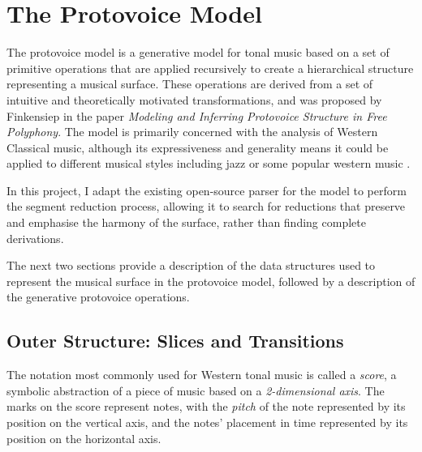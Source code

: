 \documentclass[12pt,a4paper,twoside,openany]{report} \usepackage[pdfborder={0 0 0}]{hyperref}    %
\theoremstyle{definition} \newtheorem{definition}{Definition}[section]
\begin{document}


\section{The Protovoice Model}
\label{sec:protovoiceModel}

The protovoice model is a generative model for tonal music based on a set of primitive operations that are applied
recursively to create a hierarchical structure representing a musical surface. 
These operations are derived from a set of intuitive and theoretically motivated transformations, and was proposed by Finkensiep in the paper 
\textit{Modeling and Inferring Protovoice Structure in Free Polyphony}\cite{finkensiepModelingInferringProtovoice2021}.
The model is primarily concerned with the analysis of Western Classical music, although its expressiveness and generality means it could be applied to different musical styles including jazz or some popular western music \cite{finkensiepStructureFreePolyphony2023}. 

In this project, I adapt the existing open-source parser for the model \cite{finkensiepProtovoicesModelTonal2021} to
perform the segment reduction process, allowing it to search for reductions that preserve and emphasise the harmony of
the surface, rather than finding complete derivations. 

The next two sections provide a description of the data structures used to represent the musical surface in the protovoice model, followed by a description of the generative protovoice operations. 

\subsection{Outer Structure: Slices and Transitions} 
\label{sub:slicesTransitions}

The notation most commonly used for Western tonal music is called a \textit{score}, a symbolic abstraction of a piece of music based on a \textit{2-dimensional axis}.
The marks on the score represent notes, with the \textit{pitch} of the note represented by its position on the vertical axis, and the notes' placement in time represented by its position on the horizontal axis. 
\end{document}

